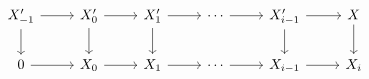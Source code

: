 \documentclass[12pt]{standalone}
\begin{document}
        $$

\begin{tikzcd}
X^\prime_{-1} \ar[r] \ar[d] & X^\prime_0 \ar[r] \ar[d] & X^\prime_1 \ar[r] \ar[d] 
& \cdots \ar[r] & X_{i-1}^\prime \ar[r] \ar[d] & X \ar[d] \\
0 \ar[r] &X_0 \ar[r] & X_1 \ar[r] & \cdots \ar[r] & X_{i-1} \ar[r] & X_i
\end{tikzcd}
        $$
        
\end{document}
